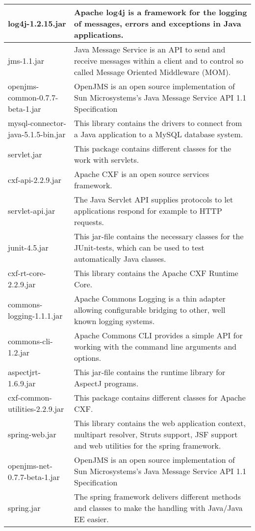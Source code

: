 \begin{center}
\begin{longtable}{|p{}|p{}|}
\hline 
log4j-1.2.15.jar & Apache log4j is a framework for the logging of messages, errors and exceptions in Java applications.\\
\hline 
jms-1.1.jar & Java Message Service is an API to send and receive messages within a client and to control so called Message Oriented Middleware (MOM).\\
\hline 
openjms-common-0.7.7-beta-1.jar & OpenJMS is an open source implementation of Sun Microsystems's Java Message Service API 1.1 Specification\\
\hline 
mysql-connector-java-5.1.5-bin.jar & This library contains the drivers to connect from a Java application to a MySQL database system.\\
\hline 
servlet.jar & This package contains different classes for the work with servlets.\\
\hline 
cxf-api-2.2.9.jar & Apache CXF is an open source services framework.  \\
\hline 
servlet-api.jar & The Java Servlet API supplies protocols to let applications respond for example to HTTP requests.\\
\hline 
junit-4.5.jar & This jar-file contains the necessary classes for the JUnit-tests, which can be used to test automatically Java classes.\\
\hline 
cxf-rt-core-2.2.9.jar & This library contains the Apache CXF Runtime Core. \\
\hline 
commons-logging-1.1.1.jar & Apache Commons Logging is a thin adapter allowing configurable bridging to other, well known logging systems.\\
\hline 
commons-cli-1.2.jar & Apache Commons CLI provides a simple API for working with the command line arguments and options.\\
\hline 
aspectjrt-1.6.9.jar & This jar-file contains the runtime library for AspectJ programs.\\
\hline 
cxf-common-utilities-2.2.9.jar & This package contains different classes for Apache CXF.\\
\hline 
spring-web.jar & This library contains the web application context, multipart resolver, Struts support, JSF support and web utilities for the spring framework.\\
\hline 
openjms-net-0.7.7-beta-1.jar & OpenJMS is an open source implementation of Sun Microsystems's Java Message Service API 1.1 Specification\\
\hline 
spring.jar & The spring framework delivers different methods and classes to make the handling with Java/Java EE easier.\\
\hline 
\end{longtable}
\label{tabular:libraries}
\end{center}
